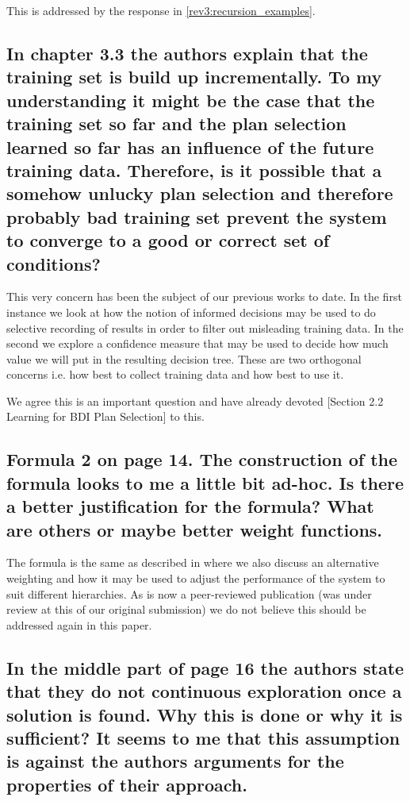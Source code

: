 \documentclass[preprint,12pt]{elsarticle}
\begin{document}
This is addressed by the response in \ref{rev3:recursion_examples}.

\subsection{ In chapter 3.3 the authors explain that the training set is build up incrementally. To my understanding it might be the case that the training set so far and the plan selection learned so far has an influence of the future training data. Therefore, is it possible that a somehow unlucky plan selection and therefore probably bad training set prevent the system to converge to a good or correct set of conditions?}

This very concern has been the subject of our previous works \cite{Airiau:IJAT09,Singh:AAMAS10} to date. In the first instance \cite{Airiau:IJAT09} we look at how the notion of informed decisions may be used to do selective recording of results in order to filter out misleading training data. In the second \cite{Singh:AAMAS10} we explore a confidence measure that may be used to  decide how much value we will put in the resulting decision tree. These are two orthogonal concerns i.e. how best to collect training data and how best to use it.

We agree this is an important question and have already devoted [Section 2.2 Learning for BDI Plan Selection] to this.

\subsection{ Formula 2 on page 14. The construction of the formula looks to me a little bit ad-hoc. Is there a better justification for the formula? What are others or maybe better weight functions.}

The formula is the same as described in \cite{Singh:AAMAS10} where we also discuss an alternative weighting and how it may be used to adjust the performance of the system to suit different hierarchies. As \cite{Singh:AAMAS10} is now a peer-reviewed publication (was under review at this of our original submission) we do not believe this should be addressed again in this paper.


\subsection{ In the middle part of page 16 the authors state that they do not continuous exploration once a solution is found. Why this is done or why it is sufficient? It seems to me that this assumption is against the authors arguments for the properties of their approach.}
\end{document}

